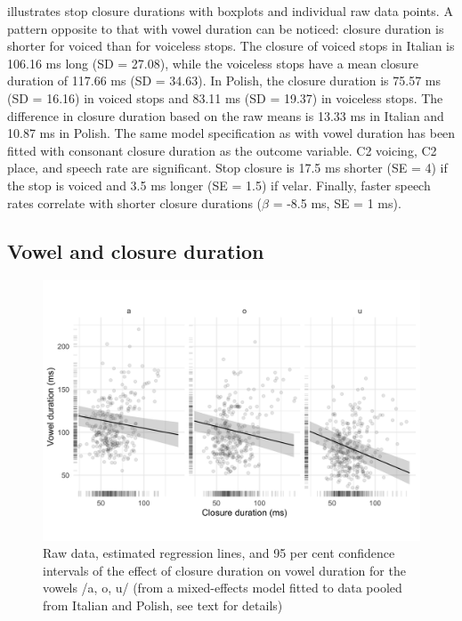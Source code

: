 \documentclass[charis]{glossa}
\begin{document}
 illustrates stop closure durations with boxplots and
individual raw data points. A pattern opposite to that with vowel
duration can be noticed: closure duration is shorter for voiced than for
voiceless stops. The closure of voiced stops in Italian is 106.16 ms
long (SD = 27.08), while the voiceless stops have a mean closure
duration of 117.66 ms (SD = 34.63). In Polish, the closure duration is
75.57 ms (SD = 16.16) in voiced stops and 83.11 ms (SD = 19.37) in
voiceless stops. The difference in closure duration based on the raw
means is 13.33 ms in Italian and 10.87 ms in Polish. The same model
specification as with vowel duration has been fitted with consonant
closure duration as the outcome variable. C2 voicing, C2 place, and
speech rate are significant. Stop closure is 17.5 ms shorter (SE = 4) if
the stop is voiced and 3.5 ms longer (SE = 1.5) if velar. Finally,
faster speech rates correlate with shorter closure durations
(\(\hat{\beta}\) = -8.5 ms, SE = 1 ms).

\hypertarget{vowel-and-closure-duration}{%
\subsection{Vowel and closure
duration}\label{vowel-and-closure-duration}}

\label{s:vcduration}

\begin{figure}
\includegraphics[width=\linewidth]{./Figure4-1} \caption{Raw data, estimated regression lines, and 95 per cent confidence intervals of the effect of closure duration on vowel duration for the vowels /a, o, u/ (from a mixed-effects model fitted to data pooled from Italian and Polish, see text for details)}\label{f:Figure4}
\end{figure}
\end{document}
